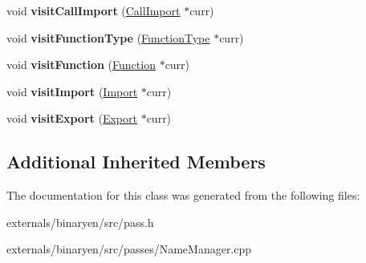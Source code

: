 \begin{DoxyCompactItemize}
void {\bfseries visit\+Call\+Import} (\mbox{\hyperlink{classwasm_1_1_call_import}{Call\+Import}} $\ast$curr)
\item 
\mbox{\label{classwasm_1_1_name_manager_a10a138d99bdaa5f6b50c911535e1fb04}} 
void {\bfseries visit\+Function\+Type} (\mbox{\hyperlink{classwasm_1_1_function_type}{Function\+Type}} $\ast$curr)
\item 
\mbox{\label{classwasm_1_1_name_manager_a5525f93b016a478c48057a13ed0aa650}} 
void {\bfseries visit\+Function} (\mbox{\hyperlink{classwasm_1_1_function}{Function}} $\ast$curr)
\item 
\mbox{\label{classwasm_1_1_name_manager_af9c82cd865be98bdfaf8d907e585dadd}} 
void {\bfseries visit\+Import} (\mbox{\hyperlink{classwasm_1_1_import}{Import}} $\ast$curr)
\item 
\mbox{\label{classwasm_1_1_name_manager_a098366cf9b703a55c757e5d3c9e356c3}} 
void {\bfseries visit\+Export} (\mbox{\hyperlink{classwasm_1_1_export}{Export}} $\ast$curr)
\end{DoxyCompactItemize}
\subsection*{Additional Inherited Members}


The documentation for this class was generated from the following files\+:\begin{DoxyCompactItemize}
\item 
externals/binaryen/src/pass.\+h\item 
externals/binaryen/src/passes/Name\+Manager.\+cpp\end{DoxyCompactItemize}
